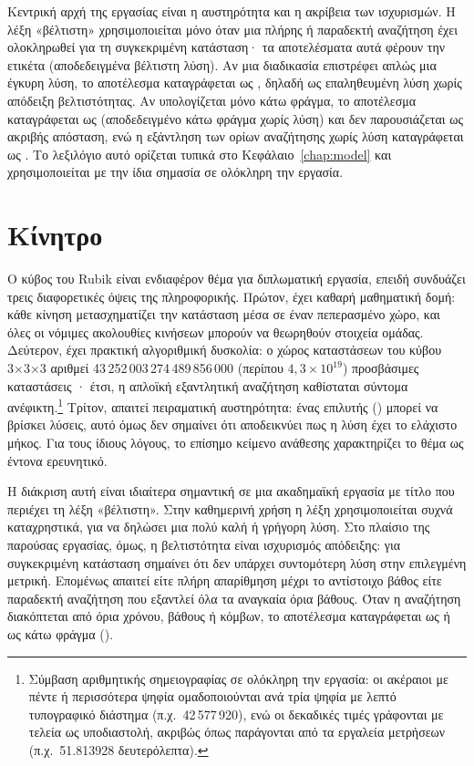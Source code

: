Κεντρική αρχή της εργασίας είναι η αυστηρότητα και η ακρίβεια των ισχυρισμών. Η λέξη «βέλτιστη» χρησιμοποιείται μόνο όταν μια πλήρης ή παραδεκτή αναζήτηση έχει ολοκληρωθεί για τη συγκεκριμένη κατάσταση· τα αποτελέσματα αυτά φέρουν την ετικέτα  (αποδεδειγμένα βέλτιστη λύση). Αν μια διαδικασία επιστρέφει απλώς μια έγκυρη λύση, το αποτέλεσμα καταγράφεται ως , δηλαδή ως επαληθευμένη λύση χωρίς απόδειξη βελτιστότητας. Αν υπολογίζεται μόνο κάτω φράγμα, το αποτέλεσμα καταγράφεται ως  (αποδεδειγμένο κάτω φράγμα χωρίς λύση) και δεν παρουσιάζεται ως ακριβής απόσταση, ενώ η εξάντληση των ορίων αναζήτησης χωρίς λύση καταγράφεται ως . Το λεξιλόγιο αυτό ορίζεται τυπικά στο Κεφάλαιο~\ref{chap:model} και χρησιμοποιείται με την ίδια σημασία σε ολόκληρη την εργασία.

\section{Κίνητρο}\label{sec:intro-motivation}
Ο κύβος του Rubik είναι ενδιαφέρον θέμα για διπλωματική εργασία, επειδή συνδυάζει τρεις διαφορετικές όψεις της πληροφορικής. Πρώτον, έχει καθαρή μαθηματική δομή: κάθε κίνηση μετασχηματίζει την κατάσταση μέσα σε έναν πεπερασμένο χώρο, και όλες οι νόμιμες ακολουθίες κινήσεων μπορούν να θεωρηθούν στοιχεία ομάδας. Δεύτερον, έχει πρακτική αλγοριθμική δυσκολία: ο χώρος καταστάσεων του κύβου 3×3×3 αριθμεί 43\,252\,003\,274\,489\,856\,000 (περίπου $4{,}3\times 10^{19}$) προσβάσιμες καταστάσεις \cite{rokicki2013diameter}· έτσι, η απλοϊκή εξαντλητική αναζήτηση καθίσταται σύντομα ανέφικτη.\footnote{Σύμβαση αριθμητικής σημειογραφίας σε ολόκληρη την εργασία: οι ακέραιοι με πέντε ή περισσότερα ψηφία ομαδοποιούνται ανά τρία ψηφία με λεπτό τυπογραφικό διάστημα (π.χ.\ 42\,577\,920), ενώ οι δεκαδικές τιμές γράφονται με τελεία ως υποδιαστολή, ακριβώς όπως παράγονται από τα εργαλεία μετρήσεων (π.χ.\ 51.813928 δευτερόλεπτα).} Τρίτον, απαιτεί πειραματική αυστηρότητα: ένας επιλυτής () μπορεί να βρίσκει λύσεις, αυτό όμως δεν σημαίνει ότι αποδεικνύει πως η λύση έχει το ελάχιστο μήκος. Για τους ίδιους λόγους, το επίσημο κείμενο ανάθεσης χαρακτηρίζει το θέμα ως έντονα ερευνητικό.

Η διάκριση αυτή είναι ιδιαίτερα σημαντική σε μια ακαδημαϊκή εργασία με τίτλο που περιέχει τη λέξη «βέλτιστη». Στην καθημερινή χρήση η λέξη χρησιμοποιείται συχνά καταχρηστικά, για να δηλώσει μια πολύ καλή ή γρήγορη λύση. Στο πλαίσιο της παρούσας εργασίας, όμως, η βελτιστότητα είναι ισχυρισμός απόδειξης: για συγκεκριμένη κατάσταση σημαίνει ότι δεν υπάρχει συντομότερη λύση στην επιλεγμένη μετρική. Επομένως απαιτεί είτε πλήρη απαρίθμηση μέχρι το αντίστοιχο βάθος είτε παραδεκτή αναζήτηση που εξαντλεί όλα τα αναγκαία όρια βάθους. Όταν η αναζήτηση διακόπτεται από όρια χρόνου, βάθους ή κόμβων, το αποτέλεσμα καταγράφεται ως  ή ως κάτω φράγμα ().

